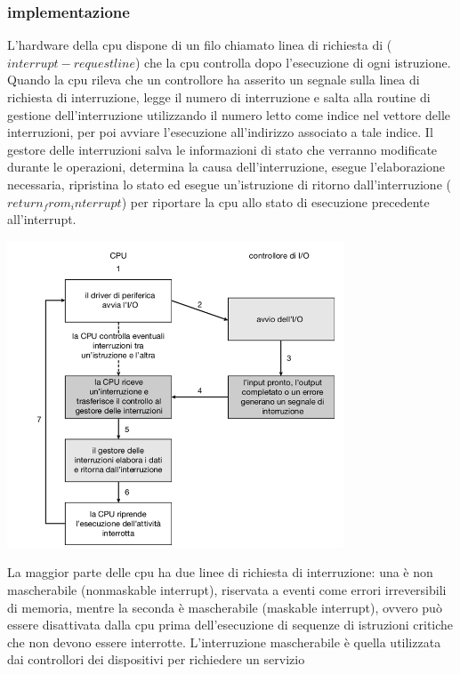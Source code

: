 \documentclass[12pt,a4paper, openany]{book}
\begin{document}
\begin{small}
		\subsubsection{implementazione}
		 L’hardware della cpu dispone di un filo chiamato linea di richiesta di
		($interrupt-request line$) che la cpu controlla dopo l’esecuzione di ogni istruzione. Quando la cpu rileva che un controllore
		ha asserito un segnale sulla linea di richiesta di interruzione, legge il numero di interruzione e salta alla routine di gestione
		dell’interruzione utilizzando il numero letto come indice nel vettore delle interruzioni, per poi avviare l’esecuzione all’indirizzo
		associato a tale indice. Il gestore delle interruzioni salva le informazioni di stato che verranno modificate durante le operazioni,
		determina la causa dell’interruzione, esegue l’elaborazione necessaria, ripristina lo stato ed esegue un’istruzione di ritorno
		dall’interruzione ($return_from_interrupt$) per riportare la cpu allo stato di esecuzione precedente all’interrupt.
		
		
		\includegraphics[width=10cm, center]{img/1.1.2.3}		
		
		 La maggior parte delle cpu ha due linee di richiesta di interruzione: una è non mascherabile (nonmaskable interrupt), riservata a
		eventi come errori irreversibili di memoria, mentre la seconda è mascherabile (maskable interrupt), ovvero può essere disattivata dalla
		cpu prima dell’esecuzione di sequenze di istruzioni critiche che non devono essere interrotte. L’interruzione mascherabile è quella
		utilizzata dai controllori dei dispositivi per richiedere un servizio		
		

\end{small}
\end{document}
